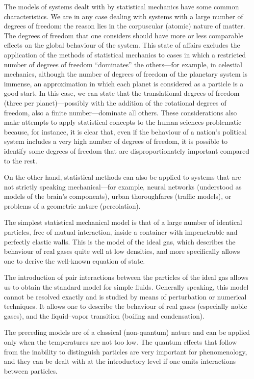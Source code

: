 \documentclass[9pt, a4paper, twoside, openright]{book}
\begin{document}
The models of systems dealt with by statistical mechanics have some common characteristics. We are in any case dealing with systems with a large number of degrees of freedom:  the reason lies in the corpuscular (atomic) nature of matter.
The degrees of freedom that one considers should have more or less comparable effects on the global behaviour of the system.  This state of affairs excludes the application of the methods of statistical mechanics to cases in which a restricted number of degrees of freedom “dominates” the others—for example, in celestial mechanics, although the number of degrees of freedom of the planetary system is immense, an approximation in which each planet is considered as a particle is a good start. In this case, we can state that the translational degrees of freedom (three per planet)—possibly with the addition of the rotational degrees of freedom, also a finite number—dominate all others.
These considerations also make attempts to apply statistical concepts to the human sciences problematic because, for instance, it is clear that, even if the behaviour of a nation’s political system includes a very high number of degrees of freedom, it is possible to identify some degrees of freedom that are disproportionately important compared to the rest.

On the other hand, statistical methods can also be applied to systems that are not strictly speaking mechanical—for example, neural networks (understood as models of the brain’s components), urban thoroughfares (traffic models), or problems of a geometric nature (percolation).

The simplest statistical mechanical model is that of a large number of identical particles, free of mutual interaction, inside a container with impenetrable and perfectly elastic walls. This is the model of the ideal gas, which describes the behaviour of real gases quite well at low densities, and more specifically allows one to derive the well-known equation of state.

The introduction of pair interactions between the particles of the ideal gas allows us to obtain the standard model for simple fluids. Generally speaking, this model cannot be resolved exactly and is studied by means of perturbation or numerical techniques. It allows one to describe the behaviour of real gases (especially noble gases), and the liquid–vapor transition (boiling and condensation).

The preceding models are of a classical (non-quantum) nature and can be applied only when the temperatures are not too low. The quantum effects that follow from the inability to distinguish particles are very important for phenomenology, and they can be dealt with at the introductory level if one omits interactions between particles. 
\end{document}
